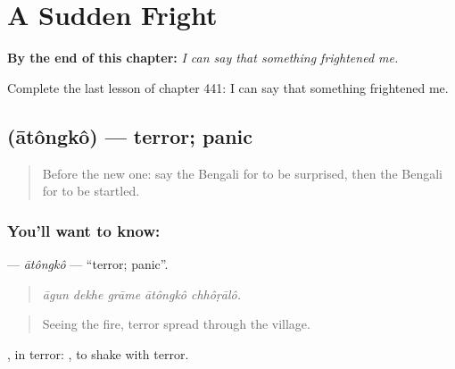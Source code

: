 
\chapter{A Sudden Fright}
\label{ch:bn-a-sudden-fright}

\begin{chapteropening}
\textbf{By the end of this chapter:} \emph{I can say that something frightened me.}

Complete the last lesson of chapter 441: I can say that something frightened me.
\end{chapteropening}

\section[\texorpdfstring{\bn{আতঙ্ক} (ātôngkô)}{আতঙ্ক (ātôngkô)}]{ (ātôngkô) — terror; panic}

\label{lesson:BN-C441-atongko}



\begin{quote}
Before the new one: say the Bengali for to be surprised, then the Bengali for to be startled.
\end{quote}

\subsection*{You'll want to know: }
\textbf{} — \emph{ātôngkô} — \textquotedblleft{}terror; panic\textquotedblright{}.

\begin{quote}
    
\end{quote}

\begin{quote}
\emph{āgun dekhe grāme ātôngkô chhôṛālô.}
\end{quote}

\begin{quote}
Seeing the fire, terror spread through the village.
\end{quote}

, in terror:  , to shake with terror.

